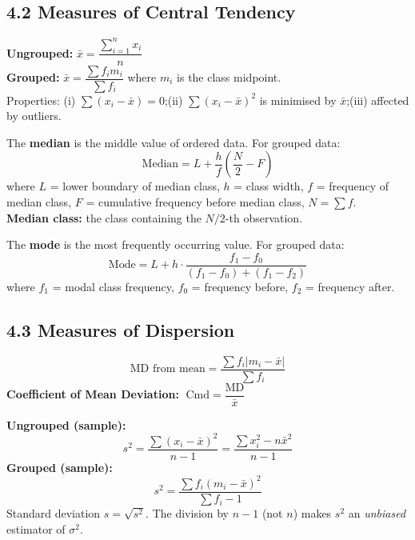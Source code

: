 \documentclass[12pt]{article}
\begin{document}
\subsection{4.2 Measures of Central Tendency}

\begin{defbox}
\textbf{Ungrouped:} $\bar x=\dfrac{\sum_{i=1}^n x_i}{n}$\\[8pt]
\textbf{Grouped:} $\bar x=\dfrac{\sum f_i m_i}{\sum f_i}$ where $m_i$ is the class midpoint.\\[4pt]
Properties: (i) $\sum(x_i-\bar x)=0$;\quad (ii) $\sum(x_i-\bar x)^2$ is minimised by $\bar x$;\quad (iii) affected by outliers.
\end{defbox}

\begin{defbox}[Median]
The \textbf{median} is the middle value of ordered data. For grouped data:
\[
\text{Median} = L + \frac{h}{f}\!\left(\frac{N}{2}-F\right)
\]
where $L$ = lower boundary of median class, $h$ = class width, $f$ = frequency of median class, $F$ = cumulative frequency before median class, $N=\sum f$.\\[4pt]
\textbf{Median class:} the class containing the $N/2$-th observation.
\end{defbox}

\begin{defbox}[Mode]
The \textbf{mode} is the most frequently occurring value. For grouped data:
\[
\text{Mode} = L + h\cdot\frac{f_1-f_0}{(f_1-f_0)+(f_1-f_2)}
\]
where $f_1$ = modal class frequency, $f_0$ = frequency before, $f_2$ = frequency after.
\end{defbox}

\subsection{4.3 Measures of Dispersion}

\begin{defbox}
\[\text{MD from mean}=\frac{\sum f_i|m_i-\bar x|}{\sum f_i}\]
\textbf{Coefficient of Mean Deviation:} $\;\text{Cmd}=\dfrac{\text{MD}}{\bar x}$
\end{defbox}

\begin{defbox}
\textbf{Ungrouped (sample):}
\[s^2=\frac{\sum(x_i-\bar x)^2}{n-1}=\frac{\sum x_i^2-n\bar x^2}{n-1}\]
\textbf{Grouped (sample):}
\[s^2=\frac{\sum f_i(m_i-\bar x)^2}{\sum f_i-1}\]
Standard deviation $s=\sqrt{s^2}$. The division by $n-1$ (not $n$) makes $s^2$ an \textit{unbiased} estimator of $\sigma^2$.
\end{defbox}
\end{document}
